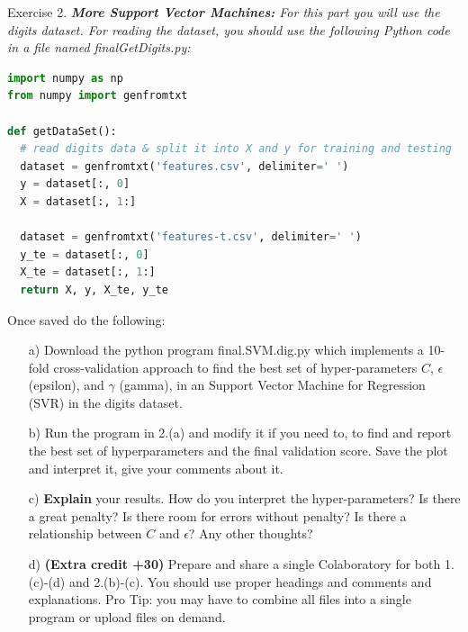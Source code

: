 \documentclass[12pt]{article}
\newenvironment{exercise}[1][]{%
  \bigskip                          %
  \noindent \textsf{Exercise #1.}\slshape }{}
\begin{document}
\begin{exercise}[2] %
  \textbf{More Support Vector Machines: } For this part you will 
  use the digits dataset. For reading the dataset, you should use 
  the following Python code in a file named finalGetDigits.py:
  \lstset{language=Python,frame=single}
  \begin{lstlisting}[language=Python,frame=single]
import numpy as np
from numpy import genfromtxt

def getDataSet():
  # read digits data & split it into X and y for training and testing
  dataset = genfromtxt('features.csv', delimiter=' ')
  y = dataset[:, 0]
  X = dataset[:, 1:]

  dataset = genfromtxt('features-t.csv', delimiter=' ')
  y_te = dataset[:, 0]
  X_te = dataset[:, 1:]
  return X, y, X_te, y_te
  \end{lstlisting}
  Once saved do the following:
  \begin{enumerate}
    \item[a)]  Download the python program final.SVM.dig.py 
    which implements a 10-fold cross-validation approach 
    to find the best set of hyper-parameters $C$, $\epsilon$ 
    (epsilon), and $\gamma$ (gamma), in an Support
    Vector Machine for Regression (SVR) in the digits dataset.
    \item[b)]  Run the program in 2.(a) and modify it if you 
    need to, to find and report the best set of 
    hyperparameters and the final validation score. 
    Save the plot and interpret it, give your comments
    about it.
    \item[c)] \textbf{Explain} your results. How do you interpret the 
    hyper-parameters? Is there a great penalty?
    Is there room for errors without penalty? Is there a 
    relationship between $C$ and $\epsilon$? Any other
    thoughts?
    \item[d)]  \textbf{(Extra credit +30)} Prepare and share a single 
    Colaboratory for both 1.(c)-(d) and 2.(b)-(c).
    You should use proper headings and comments and 
    explanations. Pro Tip: you may have to
    combine all files into a single program or upload 
    files on demand.
  \end{enumerate}
\end{exercise}
   
\end{document}
